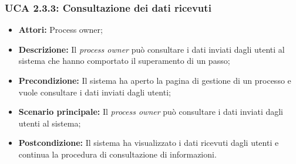\subsubsection{UCA 2.3.3: Consultazione dei dati ricevuti}
\begin{itemize}
\item \textbf{Attori:} Process owner;
\item \textbf{Descrizione:}
Il \textit{process owner} può consultare i dati inviati dagli utenti al sistema che hanno comportato il superamento di un passo;
\item \textbf{Precondizione:}
Il sistema ha aperto la pagina di gestione di un processo e vuole consultare i dati inviati dagli utenti;
\item \textbf{Scenario principale:} Il \textit{process owner} può consultare i dati inviati dagli utenti al sistema;
\item \textbf{Postcondizione:}
Il sistema ha visualizzato i dati ricevuti dagli utenti e continua la procedura di consultazione di informazioni.
\end{itemize}

\hypertarget{A2.4}{}
